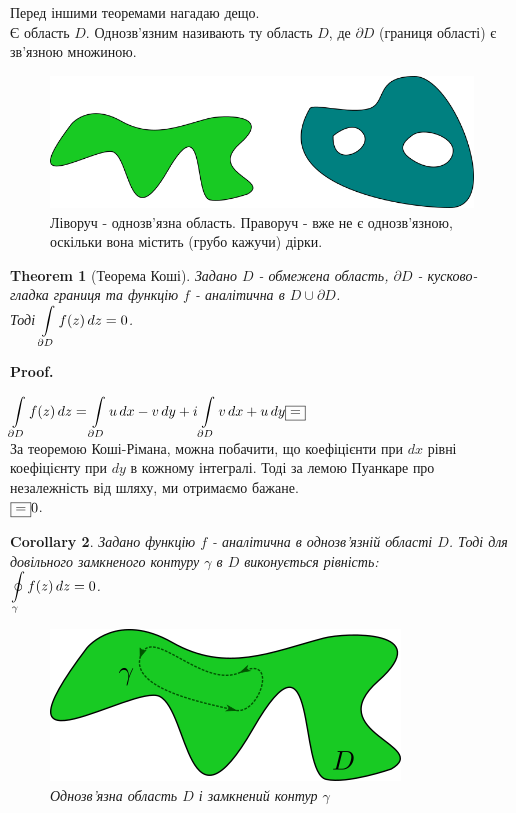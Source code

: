 \documentclass[a4paper, 10pt]{article}
\makeatletter
\def\qed{$\blacksquare$}
\theoremstyle{theoremdd}
\newtheorem{theorem}{Theorem}[subsection]
\theoremstyle{theoremdd}
\theoremstyle{theoremdd}
\theoremstyle{theoremdd}
\theoremstyle{theoremdd}
\theoremstyle{theoremdd}
\theoremstyle{theoremdd}
\theoremstyle{theoremdd}
\newtheorem{corollary}[theorem]{Corollary}
\renewenvironment{proof}[1][Proof.\\]{\par
\pushQED{\hfill \qed}%
\normalfont \topsep6\p@\@plus6\p@\relax
\trivlist
\item\relax
{\bfseries
#1\@addpunct{.}}\hspace\labelsep\ignorespaces
}{%
\popQED\endtrivlist\@endpefalse
}
\makeatother
\begin{document}
Перед іншими теоремами нагадаю дещо.\\
Є область $D$. Однозв'язним називають ту область $D$, де $\partial D$ (границя області) є зв'язною множиною.
\begin{figure}[h]
	\captionsetup{justification=centering}
	\centerline{\includegraphics[scale = 0.5]{simply_connected.png}}
	\caption*{Ліворуч - однозв'язна область. Праворуч - вже не є однозв'язною, оскільки вона містить (грубо кажучи) дірки.}
\end{figure}

\begin{theorem}[Теорема Коші]
Задано $D$ - обмежена область, $\partial D$ - кусково-гладка границя та функцію $f$ - аналітична в $D \cup \partial D$.\\
Тоді $\displaystyle\int\displaylimits_{\partial D} f(z)\,dz = 0$.
\end{theorem}

\begin{proof}
$\displaystyle\int\displaylimits_{\partial D} f(z)\,dz = \int\displaylimits_{\partial D} u\,dx-v\,dy + i\int\displaylimits_{\partial D} v\,dx+u\,dy \fbox{=}$\\
За теоремою Коші-Рімана, можна побачити, що коефіцієнти при $dx$ рівні коефіцієнту при $dy$ в кожному інтегралі. Тоді за лемою Пуанкаре про незалежність від шляху, ми отримаємо бажане.\\
$\fbox{=} 0$.
\end{proof}
	
\begin{corollary}
Задано функцію $f$ - аналітична в однозв'язній області $D$. Тоді для довільного замкненого контуру $\gamma$ в $D$ виконується рівність:\\
$\displaystyle\oint\displaylimits_{\gamma} f(z)\,dz=0$.
\begin{figure}[h]
\centerline{\includegraphics[scale = 1]{g1026.png}}
\caption*{Однозв'язна область $D$ і замкнений контур $\gamma$}
\end{figure}
\end{corollary}
\end{document}
